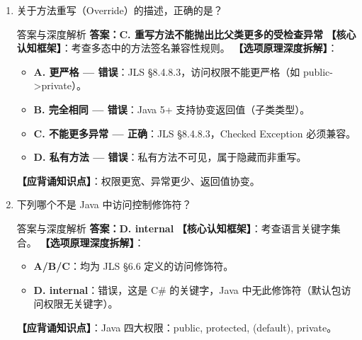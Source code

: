 ﻿\documentclass[12pt, a4paper]{ctexart}
\begin{document}
\begin{enumerate}[label=\arabic*., itemsep=1.5em]
	\item 关于方法重写（Override）的描述，正确的是？
	      \begin{bluebox}{答案与深度解析}
		      \textbf{答案：C. 重写方法不能抛出比父类更多的受检查异常}
		      \textbf{【核心认知框架】}：考查多态中的方法签名兼容性规则。
		      \textbf{【选项原理深度拆解】}：
		      \begin{itemize}[leftmargin=*, nosep]
			      \item \textbf{A. 更严格 — 错误}：JLS §8.4.8.3，访问权限不能更严格（如 public->private）。
			      \item \textbf{B. 完全相同 — 错误}：Java 5+ 支持协变返回值（子类类型）。
			      \item \textbf{C. 不能更多异常 — 正确}：JLS §8.4.8.3，Checked Exception 必须兼容。
			      \item \textbf{D. 私有方法 — 错误}：私有方法不可见，属于隐藏而非重写。
		      \end{itemize}
		      \textbf{【应背诵知识点】}：权限更宽、异常更少、返回值协变。
	      \end{bluebox}

	\item 下列哪个不是 Java 中访问控制修饰符？
	      \begin{bluebox}{答案与深度解析}
		      \textbf{答案：D. internal}
		      \textbf{【核心认知框架】}：考查语言关键字集合。
		      \textbf{【选项原理深度拆解】}：
		      \begin{itemize}[leftmargin=*, nosep]
			      \item \textbf{A/B/C}：均为 JLS §6.6 定义的访问修饰符。
			      \item \textbf{D. internal}：错误，这是 C\# 的关键字，Java 中无此修饰符（默认包访问权限无关键字）。
		      \end{itemize}
		      \textbf{【应背诵知识点】}：Java 四大权限：public, protected, (default), private。
	      \end{bluebox}


\end{enumerate}
\end{document}
